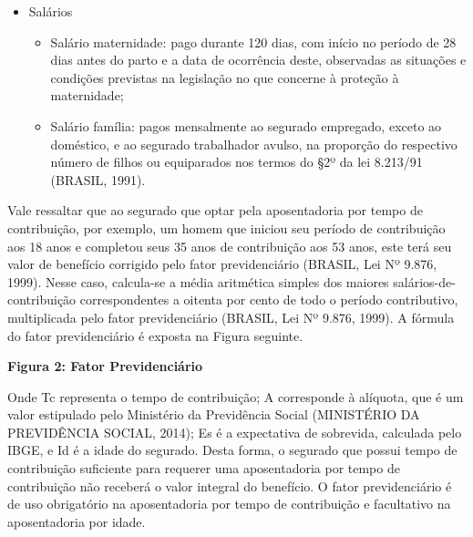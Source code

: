 \begin{apendicesenv}
\begin{itemize}
\begin{itemize}
		\end{itemize}
\item Salários

		\begin{itemize}
		\item Salário maternidade: pago durante 120 dias, com início no período de 28 dias antes do parto e a data de ocorrência deste, observadas as situações e condições previstas na legislação no que concerne à proteção à maternidade;
		\item Salário família: pagos mensalmente ao segurado empregado, exceto ao doméstico, e ao segurado trabalhador avulso, na proporção do respectivo número de filhos ou equiparados nos termos do  \S 2º  da lei 8.213/91 (BRASIL, 1991).
		\end{itemize}
\end{itemize}

Vale ressaltar que ao segurado que optar pela aposentadoria por tempo de contribuição, por exemplo, um homem que iniciou seu período de contribuição aos 18 anos e completou seus 35 anos de contribuição aos 53 anos, este terá seu valor de benefício corrigido pelo fator previdenciário (BRASIL, Lei Nº 9.876, 1999). Nesse caso, calcula-se a média aritmética simples dos maiores salários-de-contribuição correspondentes a oitenta por cento de todo o período contributivo, multiplicada pelo fator previdenciário (BRASIL, Lei Nº 9.876, 1999). A fórmula do fator previdenciário é exposta na Figura seguinte.

\textbf{Figura 2: Fator Previdenciário}

Onde Tc representa o tempo de contribuição; A corresponde à alíquota, que é um valor estipulado pelo Ministério da Previdência Social (MINISTÉRIO DA PREVIDÊNCIA SOCIAL, 2014); Es é a expectativa de sobrevida, calculada pelo IBGE, e Id é a idade do segurado. Desta forma, o segurado que possui tempo de contribuição suficiente para requerer uma aposentadoria por tempo de contribuição não receberá o valor integral do benefício. O fator previdenciário é de uso obrigatório na aposentadoria por tempo de contribuição e facultativo na aposentadoria por idade.


\end{apendicesenv}
